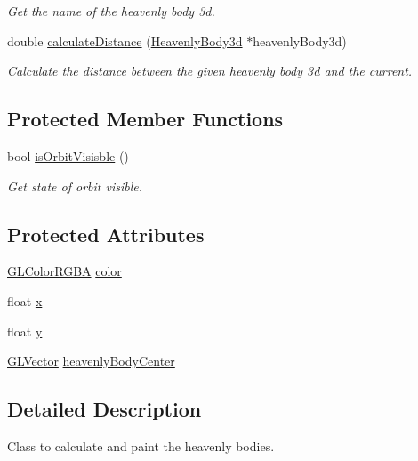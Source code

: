 \begin{DoxyCompactItemize}
\begin{DoxyCompactList}\small\item\em \-Get the name of the heavenly body 3d. \end{DoxyCompactList}\item 
double \hyperlink{classHeavenlyBody3d_aa5abdb6a4b58366c48f86b41b3c24574}{calculate\-Distance} (\hyperlink{classHeavenlyBody3d}{\-Heavenly\-Body3d} $\ast$heavenly\-Body3d)
\begin{DoxyCompactList}\small\item\em \-Calculate the distance between the given heavenly body 3d and the current. \end{DoxyCompactList}\end{DoxyCompactItemize}
\subsection*{\-Protected \-Member \-Functions}
\begin{DoxyCompactItemize}
\item 
bool \hyperlink{classHeavenlyBody3d_a13a4439fcde475a19632b84e3e244446}{is\-Orbit\-Visisble} ()
\begin{DoxyCompactList}\small\item\em \-Get state of orbit visible. \end{DoxyCompactList}\end{DoxyCompactItemize}
\subsection*{\-Protected \-Attributes}
\begin{DoxyCompactItemize}
\item 
\hyperlink{classGLColorRGBA}{\-G\-L\-Color\-R\-G\-B\-A} \hyperlink{classHeavenlyBody3d_a2ebcfe6746f12921e1ef0c9bfeb4a9cb}{color}
\item 
float \hyperlink{classHeavenlyBody3d_a287510419f9dd9019fbfd56154c15f75}{x}
\item 
float \hyperlink{classHeavenlyBody3d_a219f2f76157b162a89a4bbdbec72dbff}{y}
\item 
\hyperlink{classGLVector}{\-G\-L\-Vector} \hyperlink{classHeavenlyBody3d_a3fa03680a708c4c58d4db74b8fdf58fb}{heavenly\-Body\-Center}
\end{DoxyCompactItemize}


\subsection{\-Detailed \-Description}
\-Class to calculate and paint the heavenly bodies.

